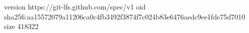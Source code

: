 version https://git-lfs.github.com/spec/v1
oid sha256:aa15572079a11206ca0c4fb3492f3874f7c024b83e6476aedc9ee1fde75d7010
size 418322
